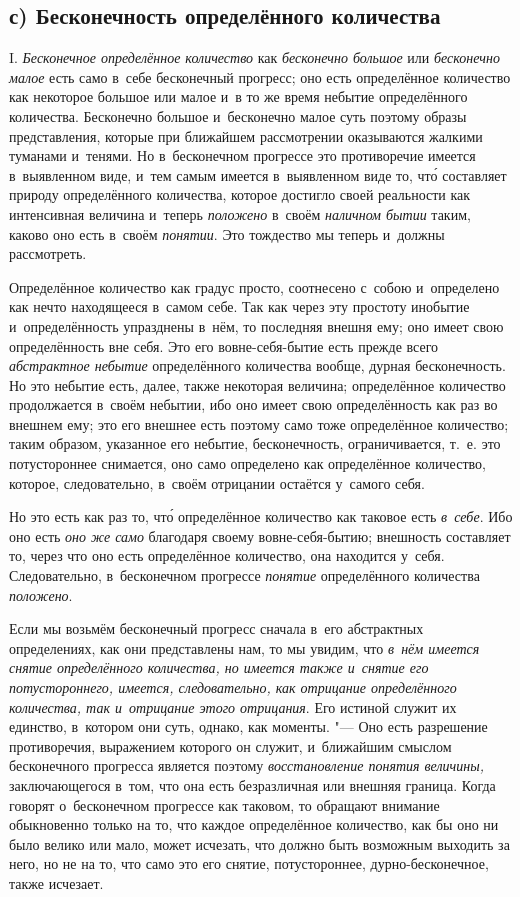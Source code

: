 \subsection[с) Бесконечность определённого количества]%
{с) Бесконечность определённого количества}

I. {\em Бесконечное определённое количество} как {\em бесконечно большое} или
{\em бесконечно малое} есть само в~себе бесконечный прогресс; оно есть
определённое количество как некоторое большое или малое и~в то же время
небытие определённого количества. Бесконечно большое и~бесконечно малое суть
поэтому образы представления, которые при ближайшем рассмотрении оказываются
жалкими туманами и~тенями. Но в~бесконечном прогрессе это противоречие имеется
в~выявленном виде, и~тем самым имеется в~выявленном виде то, чт\'{о} составляет
природу определённого количества, которое достигло своей реальности как
интенсивная величина и~теперь {\em положено} в~своём {\em наличном бытии}
таким, каково оно есть в~своём {\em понятии}. Это тождество мы теперь и~должны
рассмотреть.

Определённое количество как градус просто, соотнесено с~собою и~определено как
нечто находящееся в~самом себе. Так как через эту простоту инобытие
и~определённость упразднены в~нём, то последняя внешня ему; оно имеет свою
определённость вне себя. Это его вовне-себя-бытие есть прежде всего
{\em абстрактное небытие} определённого количества вообще, дурная
бесконечность. Но это небытие есть, далее, также некоторая величина;
определённое количество продолжается в~своём небытии, ибо оно имеет свою
определённость как раз во внешнем ему; это его внешнее есть поэтому само тоже
определённое количество; таким образом, указанное его небытие, бесконечность,
ограничивается, т.~е. это потустороннее снимается, оно само определено как
определённое количество, которое, следовательно, в~своём отрицании остаётся
у~самого себя.

Но это есть как раз то, чт\'{о} определённое количество как таковое есть
{\em в~себе}. Ибо оно есть {\em оно же само} благодаря своему вовне-себя-бытию;
внешность составляет то, через что оно есть определённое количество, она находится
у~себя. Следовательно, в~бесконечном прогрессе {\em понятие} определённого
количества {\em положено}.

Если мы возьмём бесконечный прогресс сначала в~его абстрактных определениях,
как они представлены нам, то мы увидим, что {\em в~нём имеется снятие
определённого количества, но имеется также и~снятие его потустороннего,
имеется, следовательно, как отрицание определённого количества, так и~отрицание
этого отрицания}. Его истиной служит их единство, в~котором они суть, однако,
как моменты. "--- Оно есть разрешение противоречия, выражением которого он
служит, и~ближайшим смыслом бесконечного прогресса является поэтому
{\em восстановление понятия величины,} заключающегося в~том, что она есть
безразличная или внешняя граница. Когда говорят о~бесконечном прогрессе как
таковом, то обращают внимание обыкновенно только на то, что каждое определённое
количество, как бы оно ни было велико или мало, может исчезать, что должно быть
возможным выходить за него, но не на то, что само это его снятие,
потустороннее, дурно-бесконечное, также исчезает.

